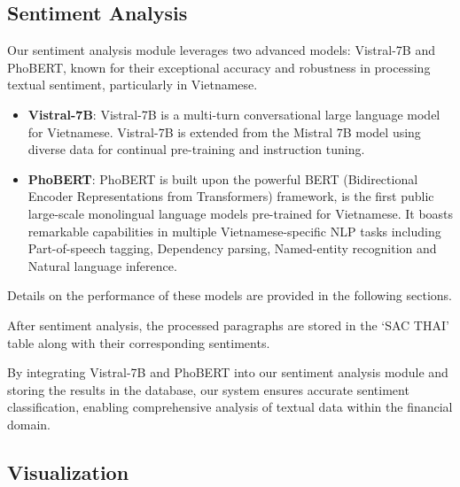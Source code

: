 {%
\subsection{Sentiment Analysis}

Our sentiment analysis module leverages two advanced models: Vistral-7B and PhoBERT, known for their exceptional accuracy and robustness in processing textual sentiment, particularly in Vietnamese.
\begin{itemize}
    \item \textbf{Vistral-7B}: Vistral-7B is a multi-turn conversational large language model for Vietnamese. Vistral-7B is extended from the Mistral 7B model using diverse data for continual pre-training and instruction tuning.
    \item \textbf{PhoBERT}: PhoBERT is built upon the powerful BERT (Bidirectional Encoder Representations from Transformers) framework, is the first public large-scale monolingual language models pre-trained for Vietnamese. It boasts remarkable capabilities in multiple Vietnamese-specific NLP tasks including Part-of-speech tagging, Dependency parsing, Named-entity recognition and Natural language inference.
\end{itemize}

Details on the performance of these models are provided in the following sections.

After sentiment analysis, the processed paragraphs are stored in the `SAC THAI' table along with their corresponding sentiments.\par
By integrating Vistral-7B and PhoBERT into our sentiment analysis module and storing the results in the database, our system ensures accurate sentiment classification, enabling comprehensive analysis of textual data within the financial domain.

\subsection{Visualization}

}
